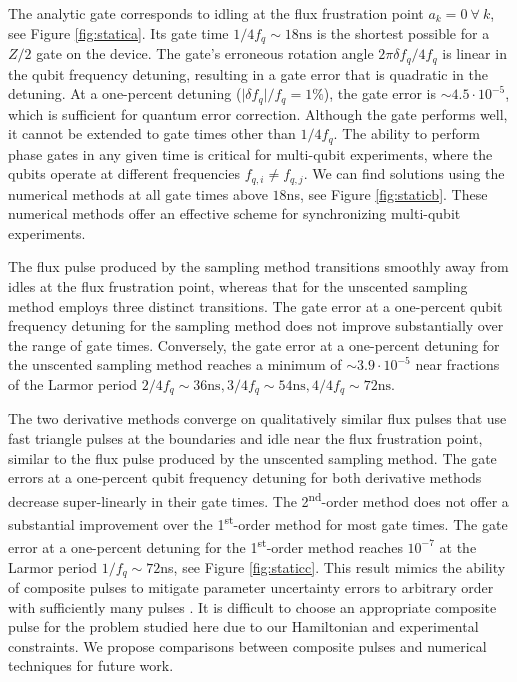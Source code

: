 The analytic gate corresponds to
idling at the flux frustration point $a_{k} = 0 \ \forall \ k$, see Figure
\ref{fig:statica}. Its gate time $1 / 4 f_{q} \sim 18\textrm{ns}$
is the shortest possible for a $Z/2$ gate on the device.
The gate's erroneous rotation angle
$2 \pi \delta f_{q} / 4 f_{q}$ is linear in the
qubit frequency detuning, resulting in a gate error that is quadratic
in the detuning.
At a one-percent
detuning ($\lvert \delta f_{q} \rvert / f_{q} = 1\%$),
the gate error is $\sim 4.5 \cdot 10^{-5}$,
which is sufficient for quantum error correction.
Although the gate performs well, it cannot be extended
to gate times other than
$1 / 4 f_{q}$. The ability to perform
phase gates in any given time is critical
for multi-qubit experiments, where the qubits operate at different
frequencies $f_{q, i} \neq f_{q, j}$.
We can find solutions using the numerical methods at
all gate times above $18$ns, see Figure \ref{fig:staticb}.
These numerical methods offer an effective scheme for synchronizing
multi-qubit experiments.

The flux pulse produced by the sampling method
transitions  smoothly away from idles at the flux frustration point,
whereas that for the unscented sampling method employs
three distinct transitions.
The gate error at a one-percent qubit frequency detuning for the sampling method
does not improve substantially over the
range of gate times. Conversely, the gate error at a one-percent detuning
for the unscented sampling method reaches a minimum of $\sim 3.9 \cdot 10^{-5}$
near fractions of the Larmor period $2/4f_{q} \sim 36\textrm{ns},
3/4f_{q} \sim 54\textrm{ns}, 4/4f_{q} \sim 72\textrm{ns}$.

The two derivative methods converge on qualitatively similar flux pulses that
use fast triangle pulses at the boundaries and idle near the flux frustration point,
similar to the flux pulse produced by the unscented sampling method.
The gate errors at a one-percent qubit frequency detuning
for both derivative methods decrease super-linearly in their gate times.
The 2\textsuperscript{nd}-order method does not offer a substantial improvement
over the 1\textsuperscript{st}-order method for most gate times.
The gate error at a one-percent detuning for the 1\textsuperscript{st}-order
method reaches $10^{-7}$ at the Larmor period $1 / f_{q} \sim 72$ns,
see Figure \ref{fig:staticc}.
This result mimics the
ability of composite pulses to mitigate parameter uncertainty errors to arbitrary
order with sufficiently many pulses \cite{merrill2014progress}.
It is difficult to choose an appropriate composite pulse
for the problem studied here due to our Hamiltonian and experimental constraints.
We propose comparisons between composite pulses and numerical techniques
for future work.

